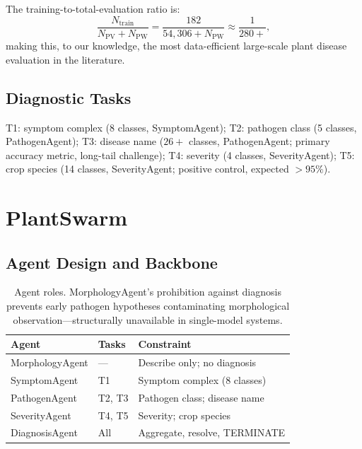 \documentclass[11pt,twocolumn]{article}
\begin{document}
The training-to-total-evaluation ratio is:
\begin{equation}
  \frac{N_\text{train}}{N_\text{PV} + N_\text{PW}}
  = \frac{182}{54{,}306 + N_\text{PW}} \approx \frac{1}{280+},
\end{equation}
making this, to our knowledge, the most
data-efficient large-scale plant disease
evaluation in the literature.

\subsection{Diagnostic Tasks}

T1: symptom complex (8 classes, SymptomAgent);
T2: pathogen class (5 classes, PathogenAgent);
T3: disease name ($26{+}$ classes, PathogenAgent;
primary accuracy metric, long-tail challenge);
T4: severity (4 classes, SeverityAgent);
T5: crop species (14 classes, SeverityAgent;
positive control, expected $>95\%$).

\section{PlantSwarm}
\label{sec:plantswarm}

\subsection{Agent Design and Backbone}

\begin{table}[t]\centering\small
\setlength{\tabcolsep}{3pt}
\begin{tabular}{llp{2.8cm}}
\toprule
\textbf{Agent} & \textbf{Tasks} & \textbf{Constraint} \\
\midrule
MorphologyAgent & ---    & Describe only; no diagnosis \\
SymptomAgent    & T1     & Symptom complex (8 classes) \\
PathogenAgent   & T2, T3 & Pathogen class; disease name \\
SeverityAgent   & T4, T5 & Severity; crop species \\
DiagnosisAgent  & All    & Aggregate, resolve, TERMINATE \\
\bottomrule
\end{tabular}
\caption{Agent roles. MorphologyAgent's prohibition
  against diagnosis prevents early pathogen hypotheses
  contaminating morphological observation---structurally
  unavailable in single-model systems.}
\label{tab:agents}
\end{table}
\end{document}
